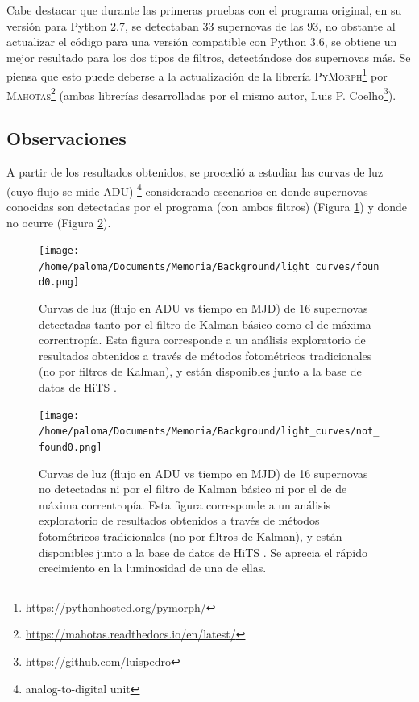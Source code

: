 Cabe destacar que durante las primeras pruebas con el programa original, en su versi\'on para Python 2.7, se detectaban 33 supernovas de las 93, no obstante al actualizar el c\'odigo para una versi\'on compatible con Python 3.6, se obtiene un mejor resultado para los dos tipos de filtros, detect\'andose dos supernovas m\'as. Se piensa que esto puede deberse a la actualizaci\'on de la librer\'ia \textsc{PyMorph}\footnote{\url{https://pythonhosted.org/pymorph/}} por \textsc{Mahotas}\footnote{\url{https://mahotas.readthedocs.io/en/latest/}} (ambas librer\'ias desarrolladas por el mismo autor, Luis P. Coelho\footnote{\url{https://github.com/luispedro}}). 
\bigskip

\subsection{Observaciones}
A partir de los resultados obtenidos, se procedi\'o a estudiar las curvas de luz (cuyo flujo se mide ADU) \footnote{analog-to-digital unit} considerando escenarios en donde supernovas conocidas son detectadas por el programa (con ambos filtros) (Figura \ref{fig:sns_found}) y donde no ocurre (Figura \ref{fig:sns_not_found}). 

\begin{figure}[h!]
\centering
\texttt{[image: /home/paloma/Documents/Memoria/Background/light\_curves/found0.png]}
\caption{Curvas de luz (flujo en ADU vs tiempo en MJD) de 16 supernovas detectadas tanto por el filtro de Kalman b\'asico como el de m\'axima correntrop\'ia. Esta figura corresponde a un an\'alisis exploratorio de resultados obtenidos a trav\'es de m\'etodos fotom\'etricos tradicionales (no por filtros de Kalman), y est\'an disponibles junto a la base de datos de HiTS \cite{hits}.}
\label{fig:sns_found}
\end{figure}

\begin{figure}[h!]
\centering
\texttt{[image: /home/paloma/Documents/Memoria/Background/light\_curves/not\_found0.png]}
\caption{Curvas de luz (flujo en ADU vs tiempo en MJD) de 16 supernovas no detectadas ni por el filtro de Kalman b\'asico ni por el de de m\'axima correntrop\'ia. Esta figura corresponde a un an\'alisis exploratorio de resultados obtenidos a trav\'es de m\'etodos fotom\'etricos tradicionales (no por filtros de Kalman), y est\'an disponibles junto a la base de datos de HiTS \cite{hits}. Se aprecia el r\'apido crecimiento en la luminosidad de una de ellas.}
\label{fig:sns_not_found}
\end{figure}

